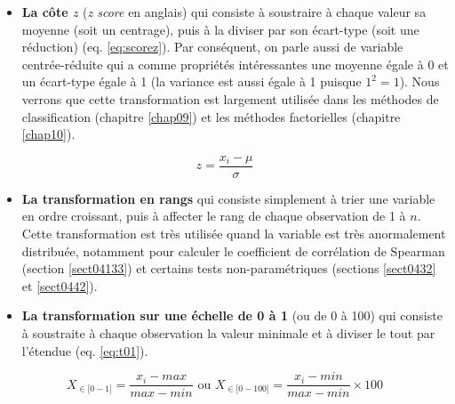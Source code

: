 \documentclass[
  11pt,
  french,
]{book}
\providecommand{\tightlist}{%
  \setlength{\itemsep}{0pt}\setlength{\parskip}{0pt}}
\begin{document}
\begin{itemize}
\tightlist
\item
  \textbf{La côte \(z\)} (\emph{z score} en anglais) qui consiste à soustraire à chaque valeur sa moyenne (soit un centrage), puis à la diviser par son écart-type (soit une réduction) (eq. \eqref{eq:scorez}). Par conséquent, on parle aussi de variable centrée-réduite qui a comme propriétés intéressantes une moyenne égale à 0 et un écart-type égale à 1 (la variance est aussi égale à 1 puisque \(1^2=1\)). Nous verrons que cette transformation est largement utilisée dans les méthodes de classification (chapitre \ref{chap09}) et les méthodes factorielles (chapitre \ref{chap10}).
\end{itemize}

\begin{equation} 
z= \frac{x_i-\mu}{\sigma}
\label{eq:scorez}
\end{equation}

\begin{itemize}
\item
  \textbf{La transformation en rangs} qui consiste simplement à trier une variable en ordre croissant, puis à affecter le rang de chaque observation de 1 à \(n\). Cette transformation est très utilisée quand la variable est très anormalement distribuée, notamment pour calculer le coefficient de corrélation de Spearman (section \ref{sect04133}) et certains tests non-paramétriques (sections \ref{sect0432} et \ref{sect0442}).
\item
  \textbf{La transformation sur une échelle de 0 à 1} (ou de 0 à 100) qui consiste à soustraite à chaque observation la valeur minimale et à diviser le tout par l'étendue (eq. \eqref{eq:t01}).
\end{itemize}

\begin{equation} 
X_{\in\lbrack0-1\rbrack}= \frac{x_i-max}{max-min} \text{ ou } X_{\in\lbrack0-100\rbrack}= \frac{x_i-min}{max-min}\times100
\label{eq:t01}
\end{equation}
\end{document}
